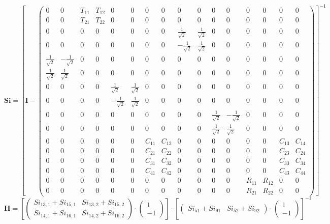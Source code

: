 \[ \mathbf{Si} = \left[ \mathbf{I}  - \left(\begin{smallmatrix} 0 & 0 & T_{11} & T_{12} & 0 & 0 & 0 & 0 & 0 & 0 & 0 & 0 & 0 & 0 & 0 & 0 \\ 0 & 0 & T_{21} & T_{22} & 0 & 0 & 0 & 0 & 0 & 0 & 0 & 0 & 0 & 0 & 0 & 0 \\ 0 & 0 & 0 & 0 & 0 & 0 & 0 & 0 & \frac{1}{\sqrt{2}} & \frac{1}{\sqrt{2}} & 0 & 0 & 0 & 0 & 0 & 0 \\ 0 & 0 & 0 & 0 & 0 & 0 & 0 & 0 & -\frac{1}{\sqrt{2}} & \frac{1}{\sqrt{2}} & 0 & 0 & 0 & 0 & 0 & 0 \\ \frac{1}{\sqrt{2}} & -\frac{1}{\sqrt{2}} & 0 & 0 & 0 & 0 & 0 & 0 & 0 & 0 & 0 & 0 & 0 & 0 & 0 & 0 \\ \frac{1}{\sqrt{2}} & \frac{1}{\sqrt{2}} & 0 & 0 & 0 & 0 & 0 & 0 & 0 & 0 & 0 & 0 & 0 & 0 & 0 & 0 \\ 0 & 0 & 0 & 0 & \frac{1}{\sqrt{2}} & \frac{1}{\sqrt{2}} & 0 & 0 & 0 & 0 & 0 & 0 & 0 & 0 & 0 & 0 \\ 0 & 0 & 0 & 0 & -\frac{1}{\sqrt{2}} & \frac{1}{\sqrt{2}} & 0 & 0 & 0 & 0 & 0 & 0 & 0 & 0 & 0 & 0 \\ 0 & 0 & 0 & 0 & 0 & 0 & 0 & 0 & 0 & 0 & \frac{1}{\sqrt{2}} & -\frac{1}{\sqrt{2}} & 0 & 0 & 0 & 0 \\ 0 & 0 & 0 & 0 & 0 & 0 & 0 & 0 & 0 & 0 & \frac{1}{\sqrt{2}} & \frac{1}{\sqrt{2}} & 0 & 0 & 0 & 0 \\ 0 & 0 & 0 & 0 & 0 & 0 & C_{11} & C_{12} & 0 & 0 & 0 & 0 & 0 & 0 & C_{13} & C_{14} \\ 0 & 0 & 0 & 0 & 0 & 0 & C_{21} & C_{22} & 0 & 0 & 0 & 0 & 0 & 0 & C_{23} & C_{24} \\ 0 & 0 & 0 & 0 & 0 & 0 & C_{31} & C_{32} & 0 & 0 & 0 & 0 & 0 & 0 & C_{33} & C_{34} \\ 0 & 0 & 0 & 0 & 0 & 0 & C_{41} & C_{42} & 0 & 0 & 0 & 0 & 0 & 0 & C_{43} & C_{44} \\ 0 & 0 & 0 & 0 & 0 & 0 & 0 & 0 & 0 & 0 & 0 & 0 & R_{11} & R_{12} & 0 & 0 \\ 0 & 0 & 0 & 0 & 0 & 0 & 0 & 0 & 0 & 0 & 0 & 0 & R_{21} & R_{22} & 0 & 0 \end{smallmatrix}\right) \right]^{-1} \]
\[ \mathbf{H} = \left[ \left(\begin{smallmatrix} Si_{13,1} + Si_{15,1} & Si_{13,2} + Si_{15,2} \\ Si_{14,1} + Si_{16,1} & Si_{14,2} + Si_{16,2} \end{smallmatrix}\right) \cdot \left(\begin{smallmatrix} 1 \\ -1 \end{smallmatrix}\right) \right]\cdot\left[ \left(\begin{smallmatrix} Si_{51} + Si_{91} & Si_{52} + Si_{92} \end{smallmatrix}\right) \cdot \left(\begin{smallmatrix} 1 \\ -1 \end{smallmatrix}\right) \right]^{-1} \]
